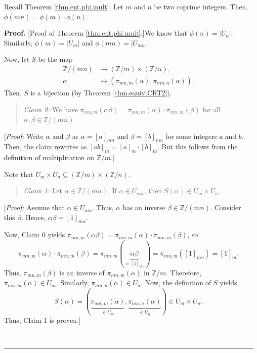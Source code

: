 \documentclass[numbers=enddot,12pt,final,onecolumn,notitlepage]{scrartcl}%
\numberwithin{exer}{subsection}
\theoremstyle{definition}
\newenvironment{statement}{\begin{quote}}{\end{quote}}
\newenvironment{proof}[1][Proof]{\noindent\textbf{#1.} }{\ \rule{0.5em}{0.5em}}
\begin{document}
Recall Theorem \ref{thm.ent.phi.mult}: Let $m$ and $n$ be two coprime
integers. Then, $\phi\left(  mn\right)  =\phi\left(  m\right)  \cdot
\phi\left(  n\right)  $.

\begin{proof}
[Proof of Theorem \ref{thm.ent.phi.mult}.]We know that $\phi\left(  n\right)
=\left\vert U_{n}\right\vert $. Similarly, $\phi\left(  m\right)  =\left\vert
U_{m}\right\vert $ and $\phi\left(  mn\right)  =\left\vert U_{mn}\right\vert $.

Now, let $S$ be the map%
\begin{align*}
\mathbb{Z}/\left(  mn\right)   &  \rightarrow\left(  \mathbb{Z}/m\right)
\times\left(  \mathbb{Z}/n\right)  ,\\
\alpha &  \mapsto\left(  \pi_{mn,m}\left(  \alpha\right)  ,\pi_{mn,n}\left(
\alpha\right)  \right)  .
\end{align*}
Then, $S$ is a bijection (by Theorem \ref{thm.equiv.CRT2}).

\begin{statement}
\textit{Claim 0:} We have $\pi_{mn,m}\left(  \alpha\beta\right)  =\pi
_{mn,m}\left(  \alpha\right)  \cdot\pi_{mn,m}\left(  \beta\right)  $ for all
$\alpha,\beta\in\mathbb{Z}/\left(  mn\right)  $.
\end{statement}

[\textit{Proof:} Write $\alpha$ and $\beta$ as $\alpha=\left[  a\right]
_{mn}$ and $\beta=\left[  b\right]  _{mn}$ for some integers $a$ and $b$.
Then, the claim rewrites as $\left[  ab\right]  _{m}=\left[  a\right]
_{m}\cdot\left[  b\right]  _{m}$. But this follows from the definition of
multiplication on $\mathbb{Z}/m$.]

Note that $U_{m}\times U_{n}\subseteq\left(  \mathbb{Z}/m\right)
\times\left(  \mathbb{Z}/n\right)  $.

\begin{statement}
\textit{Claim 1:} Let $\alpha\in\mathbb{Z}/\left(  mn\right)  $. If $\alpha\in
U_{mn}$, then $S\left(  \alpha\right)  \in U_{m}\times U_{n}$.
\end{statement}

[\textit{Proof:} Assume that $\alpha\in U_{mn}$. Thus, $\alpha$ has an inverse
$\beta\in\mathbb{Z}/\left(  mn\right)  $. Consider this $\beta$. Hence,
$\alpha\beta=\left[  1\right]  _{mn}$.

Now, Claim 0 yields $\pi_{mn,m}\left(  \alpha\beta\right)  =\pi_{mn,m}\left(
\alpha\right)  \cdot\pi_{mn,m}\left(  \beta\right)  $, so%
\[
\pi_{mn,m}\left(  \alpha\right)  \cdot\pi_{mn,m}\left(  \beta\right)
=\pi_{mn,m}\left(  \underbrace{\alpha\beta}_{=\left[  1\right]  _{mn}}\right)
=\pi_{mn,m}\left(  \left[  1\right]  _{mn}\right)  =\left[  1\right]  _{m}.
\]
Thus, $\pi_{mn,m}\left(  \beta\right)  $ is an inverse of $\pi_{mn,m}\left(
\alpha\right)  $ in $\mathbb{Z}/m$. Therefore, $\pi_{mn,m}\left(
\alpha\right)  \in U_{m}$. Similarly, $\pi_{mn,n}\left(  \alpha\right)  \in
U_{n}$. Now, the definition of $S$ yields%
\[
S\left(  \alpha\right)  =\left(  \underbrace{\pi_{mn,m}\left(  \alpha\right)
}_{\in U_{m}},\underbrace{\pi_{mn,n}\left(  \alpha\right)  }_{\in U_{n}%
}\right)  \in U_{m}\times U_{n}.
\]
Thus, Claim 1 is proven.]


\end{proof}
\end{document}
